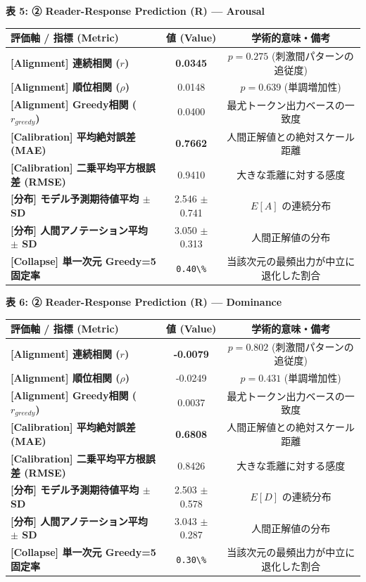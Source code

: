 \textbf{表 5: ② Reader-Response Prediction (R) — Arousal}
\begin{center}
\small
\begin{tabular}{lcc}
\toprule
\textbf{評価軸 / 指標 (Metric)} & \textbf{値 (Value)} & \textbf{学術的意味・備考} \\
\midrule
\textbf{[Alignment] 連続相関 ($r$)} & \textbf{0.0345} & $p = 0.275 $ (刺激間パターンの追従度) \\
\textbf{[Alignment] 順位相関 ($\rho$)} & 0.0148 & $p = 0.639 $ (単調増加性) \\
\textbf{[Alignment] Greedy相関 ($r_{greedy}$)} & 0.0400 & 最尤トークン出力ベースの一致度 \\
\textbf{[Calibration] 平均絶対誤差 (MAE)} & \textbf{0.7662} & 人間正解値との絶対スケール距離 \\
\textbf{[Calibration] 二乗平均平方根誤差 (RMSE)} & 0.9410 & 大きな乖離に対する感度 \\
\textbf{[分布] モデル予測期待値平均 $\pm$ SD} & 2.546 $\pm$ 0.741 & $E[A]$ の連続分布 \\
\textbf{[分布] 人間アノテーション平均 $\pm$ SD} & 3.050 $\pm$ 0.313 & 人間正解値の分布 \\
\textbf{[Collapse] 単一次元 Greedy=5 固定率} & \texttt{0.40\textbackslash{}\%} & 当該次元の最頻出力が中立に退化した割合 \\
\bottomrule
\end{tabular}
\end{center}


\textbf{表 6: ② Reader-Response Prediction (R) — Dominance}
\begin{center}
\small
\begin{tabular}{lcc}
\toprule
\textbf{評価軸 / 指標 (Metric)} & \textbf{値 (Value)} & \textbf{学術的意味・備考} \\
\midrule
\textbf{[Alignment] 連続相関 ($r$)} & \textbf{-0.0079} & $p = 0.802 $ (刺激間パターンの追従度) \\
\textbf{[Alignment] 順位相関 ($\rho$)} & -0.0249 & $p = 0.431 $ (単調増加性) \\
\textbf{[Alignment] Greedy相関 ($r_{greedy}$)} & 0.0037 & 最尤トークン出力ベースの一致度 \\
\textbf{[Calibration] 平均絶対誤差 (MAE)} & \textbf{0.6808} & 人間正解値との絶対スケール距離 \\
\textbf{[Calibration] 二乗平均平方根誤差 (RMSE)} & 0.8426 & 大きな乖離に対する感度 \\
\textbf{[分布] モデル予測期待値平均 $\pm$ SD} & 2.503 $\pm$ 0.578 & $E[D]$ の連続分布 \\
\textbf{[分布] 人間アノテーション平均 $\pm$ SD} & 3.043 $\pm$ 0.287 & 人間正解値の分布 \\
\textbf{[Collapse] 単一次元 Greedy=5 固定率} & \texttt{0.30\textbackslash{}\%} & 当該次元の最頻出力が中立に退化した割合 \\
\bottomrule
\end{tabular}
\end{center}



